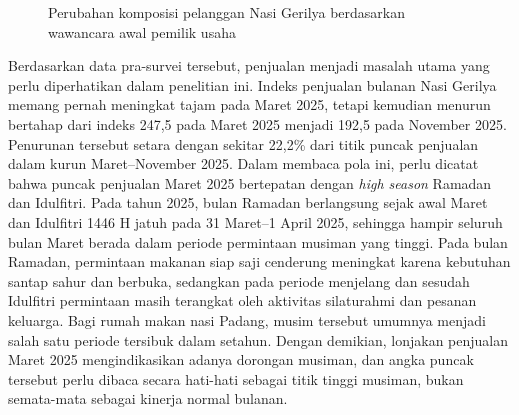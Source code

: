 \begin{figure}[!t]
    \centering
    \caption{Perubahan komposisi pelanggan Nasi Gerilya berdasarkan wawancara awal pemilik usaha}
    \label{fig:komposisi-pelanggan-gerilya}
\end{figure}
Berdasarkan data pra-survei tersebut, penjualan menjadi masalah utama yang perlu diperhatikan dalam penelitian ini. Indeks penjualan bulanan Nasi Gerilya memang pernah meningkat tajam pada Maret 2025, tetapi kemudian menurun bertahap dari indeks 247,5 pada Maret 2025 menjadi 192,5 pada November 2025. Penurunan tersebut setara dengan sekitar 22,2\% dari titik puncak penjualan dalam kurun Maret--November 2025. Dalam membaca pola ini, perlu dicatat bahwa puncak penjualan Maret 2025 bertepatan dengan \textit{high season} Ramadan dan Idulfitri. Pada tahun 2025, bulan Ramadan berlangsung sejak awal Maret dan Idulfitri 1446 H jatuh pada 31 Maret--1 April 2025, sehingga hampir seluruh bulan Maret berada dalam periode permintaan musiman yang tinggi. Pada bulan Ramadan, permintaan makanan siap saji cenderung meningkat karena kebutuhan santap sahur dan berbuka, sedangkan pada periode menjelang dan sesudah Idulfitri permintaan masih terangkat oleh aktivitas silaturahmi dan pesanan keluarga. Bagi rumah makan nasi Padang, musim tersebut umumnya menjadi salah satu periode tersibuk dalam setahun. Dengan demikian, lonjakan penjualan Maret 2025 mengindikasikan adanya dorongan musiman, dan angka puncak tersebut perlu dibaca secara hati-hati sebagai titik tinggi musiman, bukan semata-mata sebagai kinerja normal bulanan.

